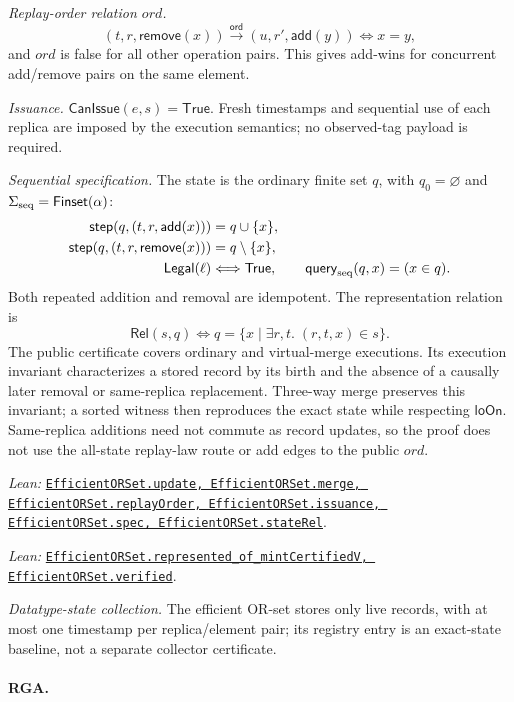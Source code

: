 \documentclass[11pt]{article}
\theoremstyle{definition}
\newcommand{\ord}{\mathrel{\xrightarrow{\mathsf{ord}}}}
\newcommand{\src}[2]{\href{../../#1}{\texttt{#2}}}
\newcommand{\anchor}[2]{\par\smallskip\noindent\emph{Lean: }\src{#1}{#2}.}
\begin{document}
\emph{Replay-order relation $ord$.}
\[
 (t,r,\mathsf{remove}(x))\ord(u,r',\mathsf{add}(y))
 \Longleftrightarrow x=y,
\]
and $ord$ is false for all other operation pairs. This gives add-wins for
concurrent add/remove pairs on the same element.

\emph{Issuance.} $\mathsf{CanIssue}(e,s)=\mathsf{True}$.
Fresh timestamps and sequential use of each replica are imposed by the
execution semantics; no observed-tag payload is required.

\emph{Sequential specification.} The state is the ordinary finite set $q$,
with $q_0=\varnothing$ and $\Sigma_{\rm seq}=\mathsf{Finset}(\alpha)$:
\[
\begin{aligned}
 \mathsf{step}(q,(t,r,\mathsf{add}(x)))&=q\cup\{x\},\\
 \mathsf{step}(q,(t,r,\mathsf{remove}(x)))&=q\setminus\{x\},\\
 \mathsf{Legal}(\ell)&\Longleftrightarrow\mathsf{True},\qquad
 \mathsf{query}_{\rm seq}(q,x)=(x\in q).
\end{aligned}
\]
Both repeated addition and removal are idempotent. The representation relation is
\[
 \mathsf{Rel}(s,q)\Longleftrightarrow
 q=\{x\mid\exists r,t.\;(r,t,x)\in s\}.
\]
The public certificate covers ordinary and virtual-merge executions.
Its execution invariant characterizes a stored record by its birth and the
absence of a causally later removal or same-replica replacement. Three-way
merge preserves this invariant; a sorted witness then reproduces the exact
state while respecting $\mathsf{loOn}$. Same-replica additions need not
commute as record updates, so the proof does not use the all-state replay-law
route or add edges to the public $ord$.
\anchor{Sal/MRDTs/Instances/EfficientORSet.lean}
  {EfficientORSet.update, EfficientORSet.merge, EfficientORSet.replayOrder,
   EfficientORSet.issuance, EfficientORSet.spec, EfficientORSet.stateRel}
\anchor{Sal/MRDTs/Instances/EfficientORSetCertified.lean}
  {EfficientORSet.represented\_of\_mintCertifiedV, EfficientORSet.verified}

\emph{Datatype-state collection.} The efficient OR-set stores only live records, with at most one
timestamp per replica/element pair; its registry entry is an exact-state
baseline, not a separate collector certificate.


\paragraph{RGA.}
\end{document}
